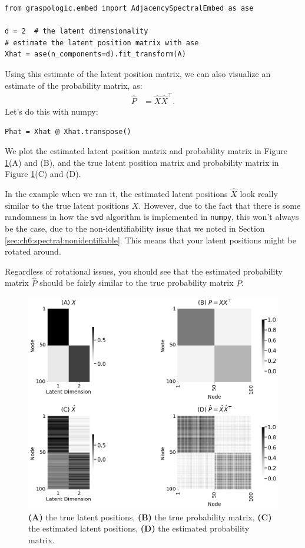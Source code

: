 \begin{lstlisting}[style=python]
from graspologic.embed import AdjacencySpectralEmbed as ase

d = 2  # the latent dimensionality
# estimate the latent position matrix with ase
Xhat = ase(n_components=d).fit_transform(A)
\end{lstlisting}
Using this estimate of the latent position matrix, we can also visualize an estimate of the probability matrix, as:
\begin{align*}
    \hat P &= \hat X \hat X^\top.
\end{align*}
Let's do this with numpy:

\begin{lstlisting}[style=python]
Phat = Xhat @ Xhat.transpose()
\end{lstlisting}
We plot the estimated latent position matrix and probability matrix in Figure \ref{fig:ch6:ase:est}(A) and (B), and the true latent position matrix and probability matrix in Figure \ref{fig:ch6:ase:est}(C) and (D).

In the example when we ran it, the estimated latent positions $\hat X$ look really similar to the true latent positions $X$. However, due to the fact that there is some randomness in how the \texttt{svd} algorithm is implemented in \texttt{numpy}, this won't always be the case, due to the non-identifiability issue that we noted in Section \ref{sec:ch6:spectral:nonidentifiable}. This means that your latent positions might be rotated around.

Regardless of rotational issues, you should see that the estimated probability matrix $\hat P$ should be fairly similar to the true probability matrix $P$.

\begin{figure}[h]
    \centering
    \includegraphics[width=0.7\linewidth]{representations/ch6/Images/ase_result.png}
    \caption[Comparison of ASE estimate to true prob. matrix]{\textbf{(A)} the true latent positions, \textbf{(B)} the true probability matrix, \textbf{(C)} the estimated latent positions, \textbf{(D)} the estimated probability matrix.}
    \label{fig:ch6:ase:est}
\end{figure}

